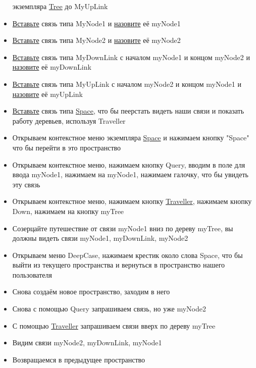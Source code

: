 \begin{itemize}
            экземпляра \hyperlink{Core.Tree.Description}{Tree} до MyUpLink
      \item \hyperlink{DeepCase.InsertLink.Description}{Вставьте} связь типа
            MyNode1
            и \hyperlink{FAQ.HowToSetName}{назовите} её myNode1
      \item \hyperlink{DeepCase.InsertLink.Description}{Вставьте} связь типа
            MyNode2
            и \hyperlink{FAQ.HowToSetName}{назовите} её myNode2
      \item \hyperlink{DeepCase.InsertLink.Description}{Вставьте} связь типа
            MyDownLink с началом myNode1 и концом myNode2 и
            \hyperlink{FAQ.HowToSetName}{назовите} её myDownLink
      \item \hyperlink{DeepCase.InsertLink.Description}{Вставьте} связь типа
            MyUpLink с началом myNode2 и концом myNode1 и
            \hyperlink{FAQ.HowToSetName}{назовите} её myUpLink
      \item \hyperlink{DeepCase.InsertLink.Description}{Вставьте} связь типа
            \hyperlink{Core.Space.Description}{Space}, что бы пеерстать видеть
            наши
            связи и показать
            работу деревьев, используя Traveller
      \item Открываем контекстное меню экземпляра
            \hyperlink{Core.Space.Description}{Space} и
            нажимаем кнопку "Space" что бы перейти в это пространство
      \item Открываем контекстное меню, нажимаем кнопку Query, вводим в поле
            для
            ввода myNode1, нажимаем на myNode1, нажимаем галочку, что бы
            увидеть
            эту связь
      \item Открываем контекстное меню, нажимаем кнопку
            \hyperlink{Traveller.Description}{Traveller}, нажимаем кнопку Down,
            нажимаем на
            кнопку
            myTree
      \item Созерцайте путешествие от связи myNode1 вниз по дереву myTree, вы
            должны видеть связи myNode1, myDownLink, myNode2
      \item Открываем меню DeepCase, нажимаем крестик около слова Space, что бы
            выйти из текущего пространства и вернуться в пространство нашего
            пользователя
      \item Снова создаём новое пространство, заходим в него
      \item Снова с помощью Query запрашиваем связь, но уже myNode2
      \item С помощью \hyperlink{Traveller.Description}{Traveller} запрашиваем
            связи вверх
            по дереву myTree
      \item Видим связи myNode2, myDownLink, myNode1
      \item Возвращаемся в предыдущее пространство
\end{itemize}
